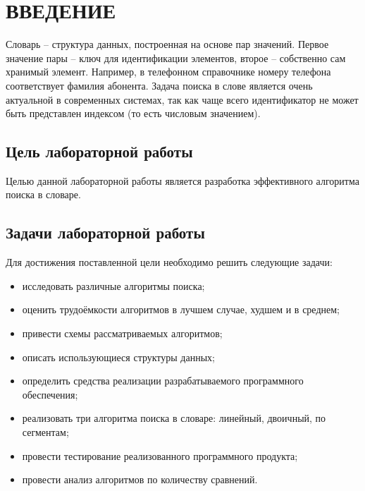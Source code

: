 \chapter*{ВВЕДЕНИЕ}

Словарь  -- структура данных, построенная  на  основе  пар  значений.  Первое  значение  пары -- ключ  для идентификации элементов, второе  -- собственно сам хранимый элемент. Например, в телефонном справочнике номеру  телефона  соответствует  фамилия  абонента. Задача поиска в слове является очень актуальной в современных системах, так как чаще всего идентификатор не может быть представлен индексом (то есть числовым значением).

\section*{Цель лабораторной работы}

Целью данной лабораторной работы является разработка эффективного алгоритма поиска в словаре.

\section*{Задачи лабораторной работы}

Для достижения поставленной цели необходимо решить следующие задачи:

\begin{itemize}
	\item исследовать различные алгоритмы поиска;
	\item оценить трудоёмкости алгоритмов в лучшем случае, худшем и в среднем;
	\item привести схемы рассматриваемых алгоритмов;
	\item описать использующиеся структуры данных;
	\item определить средства реализации разрабатываемого программного обеспечения;
	\item реализовать три алгоритма поиска в словаре: линейный, двоичный, по сегментам;
	\item провести тестирование реализованного программного продукта;
	\item провести анализ алгоритмов по количеству сравнений.
\end{itemize}